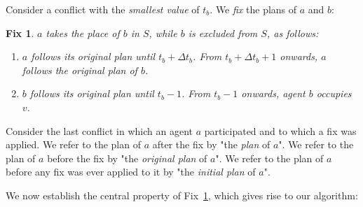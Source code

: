 \documentclass[a4paper,12pt]{article}
\newtheorem{fix}{Fix}
\newcommand{\F}[1]{\begin{fix}{\em #1}\end{fix}}
\begin{document}
Consider a conflict with the {\em smallest value} of $t_b$. We {\em fix} the plans of $a$ and $b$:
\F{$a$ takes the place of $b$ in $S$, while $b$ is excluded from $S$, as follows:
\begin{enumerate}
\item $a$ follows its original plan until $t_b+\Delta t_b$. From $t_b+\Delta t_b+1$ onwards, $a$ follows the original plan of $b$. 
\item $b$ follows its original plan until $t_b-1$. From $t_b-1$ onwards, agent $b$ occupies $v$.
\end{enumerate} \label{fix1}} 

Consider the last conflict in which an agent $a$ participated and to which a fix was applied. We refer to the plan of $a$ after the fix by "the {\em plan} of $a$". We refer to the plan of $a$ before the fix by "the {\em original plan} of $a$". We refer to the plan of $a$ before any fix was ever applied to it by "the {\em initial plan} of $a$". 

We now establish the central property of Fix~\ref{fix1}, which gives rise to our algorithm:
\end{document}
